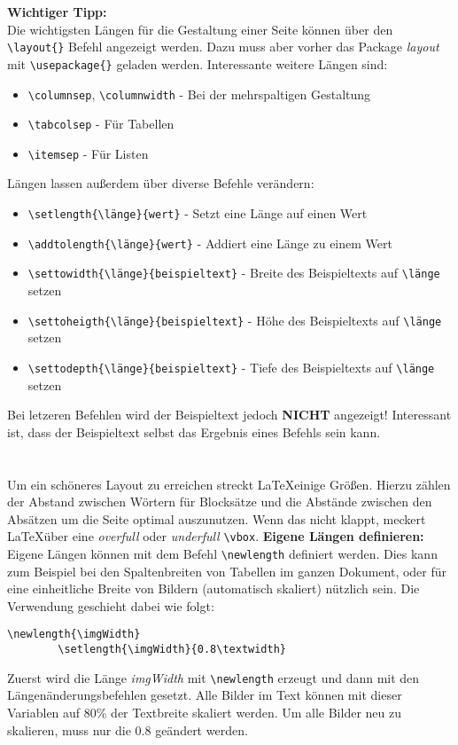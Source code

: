 \documentclass[10pt]{scrartcl}  %
\begin{document}
    \textbf{Wichtiger Tipp:}
    \\
    Die wichtigsten Längen für die Gestaltung einer Seite können über den \verb!\layout{}! Befehl angezeigt werden. Dazu muss aber vorher das Package \textsl{layout} mit \verb!\usepackage{}! geladen werden.
    Interessante weitere Längen sind:
    \begin{itemize}
        \item \verb!\columnsep!, \verb!\columnwidth! - Bei der mehrspaltigen Gestaltung
        \item \verb!\tabcolsep! - Für Tabellen
        \item \verb!\itemsep! - Für Listen
    \end{itemize}
    Längen lassen außerdem über diverse Befehle verändern:
    \begin{itemize}
        \item \verb!\setlength{\länge}{wert}! - Setzt eine Länge auf einen Wert
        \item \verb!\addtolength{\länge}{wert}! - Addiert eine Länge zu einem Wert
        \item \verb!\settowidth{\länge}{beispieltext}! - Breite des Beispieltexts auf \verb!\länge! setzen
        \item \verb!\settoheigth{\länge}{beispieltext}! - Höhe des Beispieltexts auf \verb!\länge! setzen
        \item \verb!\settodepth{\länge}{beispieltext}! - Tiefe des Beispieltexts auf \verb!\länge! setzen
    \end{itemize}
    Bei letzeren Befehlen wird der Beispieltext jedoch \textbf{NICHT} angezeigt! Interessant ist, dass der Beispieltext selbst das Ergebnis eines Befehls sein kann.
    \\
    \\
    \\
    Um ein schöneres Layout zu erreichen streckt \LaTeX \@ einige Größen. Hierzu zählen der Abstand zwischen Wörtern für Blocksätze und die Abstände zwischen den Absätzen um die Seite optimal auszunutzen. Wenn das nicht klappt, meckert \LaTeX \@ über eine \textsl{overfull} oder \textsl{underfull} \verb!\vbox!.
    \textbf{Eigene Längen definieren:}
    Eigene Längen können mit dem Befehl \verb!\newlength! definiert werden. Dies kann zum Beispiel bei den Spaltenbreiten von Tabellen im ganzen Dokument, oder für eine einheitliche Breite von Bildern (automatisch skaliert) nützlich sein.
    Die Verwendung geschieht dabei wie folgt:
    \lstset{language=TeX}
    \begin{lstlisting}[frame=single]
        \newlength{\imgWidth}
        \setlength{\imgWidth}{0.8\textwidth}
    \end{lstlisting}
    Zuerst wird die Länge \textsl{imgWidth} mit \verb!\newlength! erzeugt und dann mit den Längenänderungsbefehlen gesetzt.
    Alle Bilder im Text können mit dieser Variablen auf 80\% der Textbreite skaliert werden. Um alle Bilder neu zu skalieren, muss nur die 0.8 geändert werden.
\end{document}
